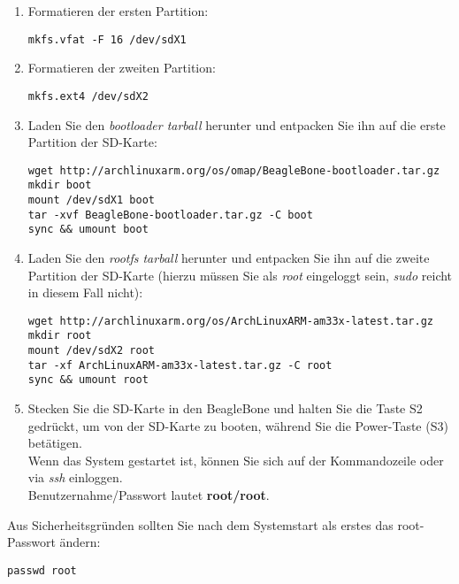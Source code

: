 \documentclass[manual.tex]{subfiles}
\begin{document}
\begin{enumerate}
\item Formatieren der ersten Partition:

\begin{lstlisting}
mkfs.vfat -F 16 /dev/sdX1
\end{lstlisting}

\item Formatieren der zweiten Partition:

\begin{lstlisting}
mkfs.ext4 /dev/sdX2
\end{lstlisting}

\item Laden Sie den \textit{bootloader tarball} herunter und entpacken Sie ihn auf die erste Partition der SD-Karte:

\begin{lstlisting}
wget http://archlinuxarm.org/os/omap/BeagleBone-bootloader.tar.gz
mkdir boot
mount /dev/sdX1 boot
tar -xvf BeagleBone-bootloader.tar.gz -C boot
sync && umount boot
\end{lstlisting}

\item Laden Sie den \textit{rootfs tarball} herunter und entpacken Sie ihn auf die zweite Partition der SD-Karte (hierzu müssen Sie als \textit{root} eingeloggt sein, \emph{sudo} reicht in diesem Fall nicht):

\begin{lstlisting}
wget http://archlinuxarm.org/os/ArchLinuxARM-am33x-latest.tar.gz
mkdir root
mount /dev/sdX2 root
tar -xf ArchLinuxARM-am33x-latest.tar.gz -C root
sync && umount root
\end{lstlisting}

\item Stecken Sie die SD-Karte in den BeagleBone und halten Sie die Taste S2 gedrückt, um von der SD-Karte zu booten, während Sie die Power-Taste (S3) betätigen.\\
Wenn das System gestartet ist, können Sie sich auf der Kommandozeile oder via \emph{ssh} einloggen.\\

Benutzernahme/Passwort lautet \textbf{root/root}.

\end{enumerate}

Aus Sicherheitsgründen sollten Sie nach dem Systemstart als erstes das root-Passwort ändern:

\begin{lstlisting}
passwd root
\end{lstlisting}
\end{document}
